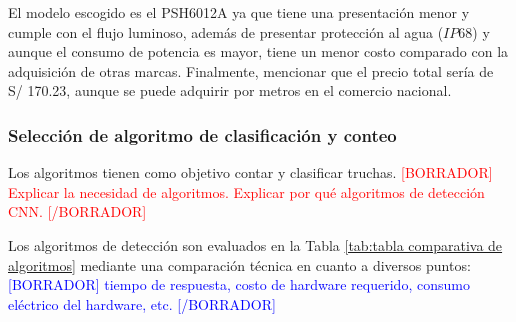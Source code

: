 El modelo escogido es el PSH6012A ya que tiene una presentación menor y cumple con el flujo luminoso, además de presentar protección al agua ($IP68$) y aunque el consumo de potencia es mayor, tiene un menor costo comparado con la adquisición de otras marcas. Finalmente, mencionar que el precio total sería de S/ 170.23, aunque se puede adquirir por metros en el comercio nacional.

\subsubsection{Selección de algoritmo de clasificación y conteo}
\label{sssec:seleccion de algoritmo de clasificacion y conteo}

Los algoritmos tienen como objetivo contar y clasificar truchas. \textcolor{red}{[BORRADOR] Explicar la necesidad de algoritmos. Explicar por qué algoritmos de detección CNN. [/BORRADOR]}

Los algoritmos de detección son evaluados en la Tabla \ref{tab:tabla comparativa de algoritmos} mediante una comparación técnica en cuanto a diversos puntos: \textcolor{blue}{[BORRADOR] tiempo de respuesta, costo de hardware requerido, consumo eléctrico del hardware, etc. [/BORRADOR]} 

